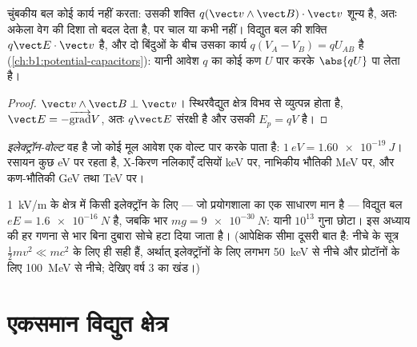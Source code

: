 \begin{proposition}[लोरेंत्स बल का कार्य]\label{prop:b1:charged-particles:work}
चुंबकीय बल कोई कार्य नहीं करता: उसकी शक्ति $q(\vect v\wedge\vect B)\cdot\vect v$
शून्य है, अतः अकेला  वेग की दिशा तो बदल देता है, पर चाल या
 कभी नहीं। विद्युत बल की शक्ति
$q\vect E\cdot\vect v$ है, और दो बिंदुओं के बीच उसका कार्य $q(V_A - V_B) =
qU_{AB}$ है (\cref{ch:b1:potential-capacitors}): यानी आवेश $q$ का कोई कण
 $U$ पार करके  $\abs{qU}$ पा लेता है।
\end{proposition}

\begin{proof}
$\vect v\wedge\vect B \perp \vect v$। स्थिरवैद्युत क्षेत्र विभव से व्युत्पन्न
होता है, $\vect E = -\overrightarrow{\operatorname{grad}}V$, अतः $q\vect E$
संरक्षी है और उसकी $E_p = qV$ है।
\end{proof}

\begin{definition}[इलेक्ट्रॉन-वोल्ट]\label{def:b1:charged-particles:eV}
\emph{इलेक्ट्रॉन-वोल्ट} वह  है जो कोई मूल आवेश एक वोल्ट पार करके
पाता है: $\qty{1}{eV} = \qty{1.60e-19}{J}$। रसायन कुछ \unit{eV} पर रहता
है, X-किरण नलिकाएँ दसियों \unit{keV} पर, नाभिकीय भौतिकी \unit{MeV} पर, और
कण-भौतिकी \unit{GeV} तथा \unit{TeV} पर।
\end{definition}

\begin{remark}[गुरुत्व की उपेक्षा क्यों]\label{rem:b1:charged-particles:gravity}
\qty{1}{kV/m} के क्षेत्र में किसी इलेक्ट्रॉन के लिए --- जो प्रयोगशाला का
एक साधारण मान है --- विद्युत बल $eE = \qty{1.6e-16}{N}$ है, जबकि भार
$mg = \qty{9e-30}{N}$: यानी $10^{13}$ गुना छोटा। इस अध्याय की हर गणना से
भार बिना दुबारा सोचे हटा दिया जाता है। (आपेक्षिक सीमा दूसरी बात है: नीचे
के सूत्र $\tfrac12 mv^2 \ll mc^2$ के लिए ही सही हैं, अर्थात् इलेक्ट्रॉनों
के लिए लगभग \qty{50}{keV} से नीचे और प्रोटॉनों के लिए \qty{100}{MeV} से
नीचे; देखिए वर्ष 3 का खंड।)
\end{remark}

\section{एकसमान विद्युत क्षेत्र}

